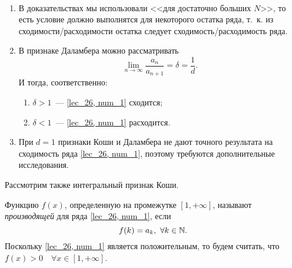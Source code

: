 \documentclass[../../main.tex]{subfiles}
\begin{document}
	\begin{remarks}
	
	~
	
	\begin{enumerate}
	\item В доказательствах мы использовали <<для достаточно больших $N$>>, 
	то есть условие должно выполнятся для некоторого остатка ряда, т.~к. из 
	сходимости/расходимости остатка следует сходимость/расходимость ряда.
	\item  В признаке Даламбера можно рассматривать
		\[  \lim_{n \to \infty} \frac{a_n}{a_{n+1}} = \delta = \frac{1}{d}. \]
		И тогда, соответственно:
		\begin{enumerate}[label={\alph*)}]
		\item $\delta > 1$~--- \eqref{lec_26, 
		num_1} сходится; \\
		\item $\delta < 1$~--- \eqref{lec_26, 
		num_1} расходится.
		\end{enumerate}
		
	\item При $d=1$ признаки Коши и Даламбера не дают точного результата 
	на сходимость ряда \eqref{lec_26, num_1}, поэтому требуются дополнительные исследования.
	\end{enumerate}
	\end{remarks}
	
	Рассмотрим также интегральный признак Коши.
	
	Функцию $f(x)$, определенную на промежутке $[1, + \infty]$, называют 
		\emph{производящей} для ряда \eqref{lec_26, num_1}, если
		\[ f(k) = a_k, \ \forall k \in \mathbb{N}.\]
		Поскольку \eqref{lec_26, num_1} является положительным, то будем считать, что
		$f(x) > 0 \quad \forall x \in 
		[1, + \infty]$.
	
\end{document}
